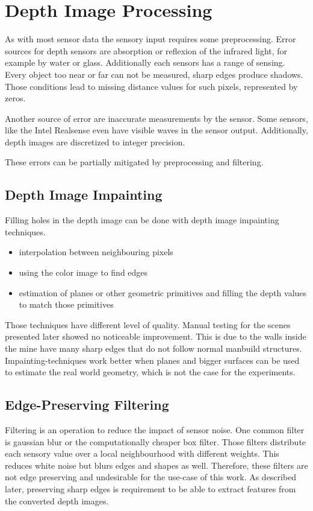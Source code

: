 \section{Depth Image Processing}

As with most sensor data the sensory input requires some preprocessing.
Error sources for depth sensors are absorption or reflexion of the infrared light, for example by water or glass.
Additionally each sensors has a range of sensing.
Every object too near or far can not be measured, sharp edges produce shadows.
Those conditions lead to missing distance values for such pixels, represented by zeros.

Another source of error are inaccurate measurements by the sensor.
Some sensors, like the Intel Realsense even have visible waves in the sensor output.
Additionally, depth images are discretized to integer precision.

These errors can be partially mitigated by preprocessing and filtering.

\subsection{Depth Image Impainting}

Filling holes in the depth image can be done with depth image impainting techniques.

\begin{itemize}
    \item interpolation between neighbouring pixels
    \item using the color image to find edges
    \item estimation of planes or other geometric primitives and filling the depth values to match those primitives
\end{itemize}

Those techniques have different level of quality.
Manual testing for the scenes presented later showed no noticeable improvement.
This is due to the walls inside the mine have many sharp edges that do not follow normal manbuild structures.
Impainting-techniques work better when planes and bigger surfaces can be used to estimate the real world geometry, which is not the case for the experiments.

\subsection{Edge-Preserving Filtering}

Filtering is an operation to reduce the impact of sensor noise.
One common filter is gaussian blur or the computationally cheaper box filter.
Those filters distribute each sensory value over a local neighbourhood with different weights.
This reduces white noise but blurs edges and shapes as well.
Therefore, these filters are not edge preserving and undesirable for the use-case of this work.
As described later, preserving sharp edges is requirement to be able to extract features from the converted depth images.

